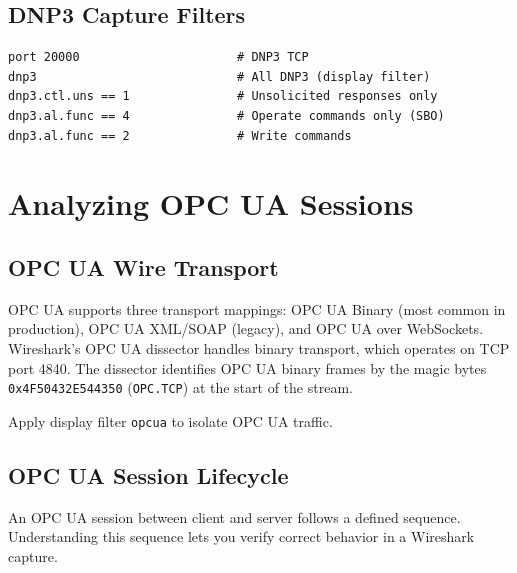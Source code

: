 \documentclass[12pt,twoside,openright]{memoir}
\newcommand{\filter}[1]{\texttt{\color{wsblue}#1}}
\newcommand{\hex}[1]{\texttt{0x#1}}
\begin{document}
\section{DNP3 Capture Filters}

\begin{filterbox}
\begin{lstlisting}
port 20000                      # DNP3 TCP
dnp3                            # All DNP3 (display filter)
dnp3.ctl.uns == 1               # Unsolicited responses only
dnp3.al.func == 4               # Operate commands only (SBO)
dnp3.al.func == 2               # Write commands
\end{lstlisting}
\end{filterbox}

\chapter{Analyzing OPC UA Sessions}

\section{OPC UA Wire Transport}

OPC UA supports three transport mappings: OPC UA Binary (most common in production), OPC UA XML/SOAP (legacy), and OPC UA over WebSockets. Wireshark's OPC UA dissector handles binary transport, which operates on TCP port 4840. The dissector identifies OPC UA binary frames by the magic bytes \hex{4F50432E544350} (\texttt{OPC.TCP}) at the start of the stream.

Apply display filter \filter{opcua} to isolate OPC UA traffic.

\section{OPC UA Session Lifecycle}

An OPC UA session between client and server follows a defined sequence. Understanding this sequence lets you verify correct behavior in a Wireshark capture.
\end{document}
